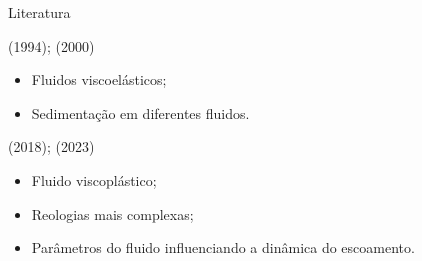 \begin{frame}{Literatura}
    \begin{exampleblock}{ (1994);  (2000)}
        \begin{itemize}
            \item Fluidos viscoelásticos;
            \item Sedimentação em diferentes fluidos.
        \end{itemize}
    \end{exampleblock}

    \begin{exampleblock}{ (2018);  (2023)}
        \begin{itemize}
            \item Fluido viscoplástico;
            \item Reologias mais complexas;
            \item Parâmetros do fluido influenciando a dinâmica do escoamento.
        \end{itemize}
    \end{exampleblock}
\end{frame}


        

